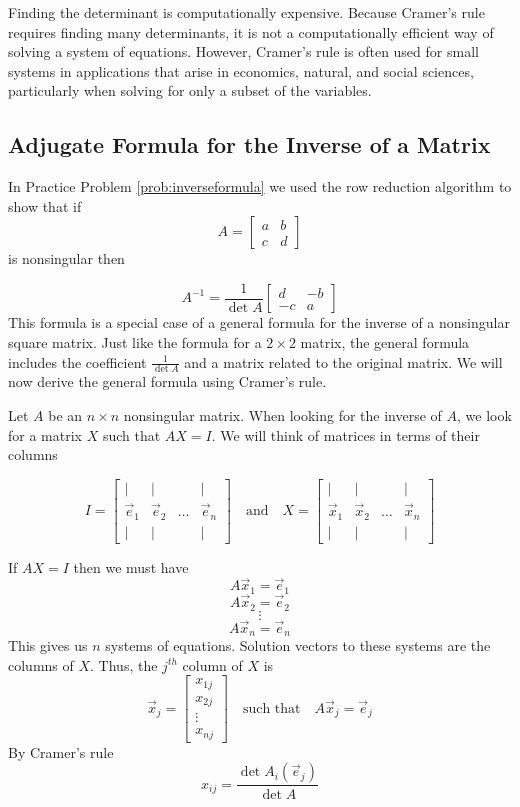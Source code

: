 \documentclass{ximera}
\begin{document}
Finding the determinant is computationally expensive.  Because Cramer's rule requires finding many determinants, it is not a computationally efficient way of solving a system of equations.  However, Cramer's rule is often used for small systems in applications that arise in economics, natural, and social sciences, particularly when solving for only a subset of the variables.

\subsection*{Adjugate Formula for the Inverse of a Matrix}

In Practice Problem \ref{prob:inverseformula} we used the row reduction algorithm to show that if $$A=\begin{bmatrix}a&b\\c&d\end{bmatrix}$$ is nonsingular then 

\begin{equation}\label{eq:twobytwoinverse}A^{-1}=\frac{1}{\det{A}}\begin{bmatrix}d&-b\\-c&a\end{bmatrix}\end{equation}
This formula is a special case of a general formula for the inverse of a nonsingular square matrix.  Just like the formula for a $2\times 2$ matrix, the general formula  includes the coefficient $\frac{1}{\det{A}}$ and a matrix related to the original matrix.  We will now derive the general formula using Cramer's rule.

Let $A$ be an $n\times n$ nonsingular matrix.  When looking for the inverse of $A$, we look for a matrix $X$ such that $AX=I$.  We will think of matrices in terms of their columns

$$I=\begin{bmatrix}
           | & |& &|\\
		\vec{e}_1 & \vec{e}_2&\dots&\vec{e}_n\\
		| & |& &|
         \end{bmatrix}\quad\text{and}\quad X=\begin{bmatrix}
           | & |& &|\\
		\vec{x}_1 & \vec{x}_2&\dots&\vec{x}_n\\
		| & |& &|
         \end{bmatrix}$$

If $AX=I$ then we must have
$$A\vec{x}_1=\vec{e}_1$$
$$A\vec{x}_2=\vec{e}_2$$
$$\vdots$$
$$A\vec{x}_n=\vec{e}_n$$
This gives us $n$ systems of equations.  Solution vectors to these systems are the columns of $X$.  Thus, the $j^{th}$ column of $X$ is
$$\vec{x}_j=\begin{bmatrix}x_{1j}\\x_{2j}\\\vdots\\x_{nj}\end{bmatrix}\quad\text{such that}\quad A\vec{x}_j=\vec{e}_j$$
By Cramer's rule 
$$x_{ij}=\frac{\det{A_i(\vec{e}_j)}}{\det{A}}$$
         
\end{document}
